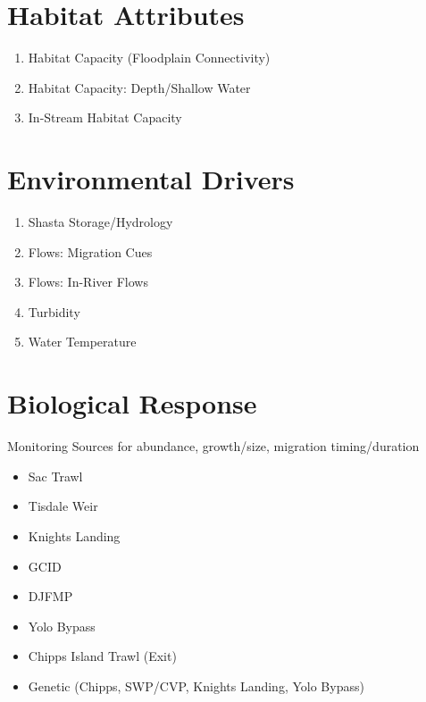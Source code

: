 \documentclass[
]{book}
\providecommand{\tightlist}{%
  \setlength{\itemsep}{0pt}\setlength{\parskip}{0pt}}
\theoremstyle{definition}
\theoremstyle{definition}
\theoremstyle{definition}
\theoremstyle{definition}
\theoremstyle{remark}
\begin{document}
\hypertarget{habitat-attributes-3}{%
\section{Habitat Attributes}\label{habitat-attributes-3}}

\begin{enumerate}
\def\labelenumi{\arabic{enumi}.}
\item
  Habitat Capacity (Floodplain Connectivity)
\item
  Habitat Capacity: Depth/Shallow Water
\item
  In-Stream Habitat Capacity
\end{enumerate}

\hypertarget{environmental-drivers-2}{%
\section{Environmental Drivers}\label{environmental-drivers-2}}

\begin{enumerate}
\def\labelenumi{\arabic{enumi}.}
\item
  Shasta Storage/Hydrology
\item
  Flows: Migration Cues
\item
  Flows: In-River Flows
\item
  Turbidity
\item
  Water Temperature
\end{enumerate}

\hypertarget{biological-response-3}{%
\section{Biological Response}\label{biological-response-3}}

Monitoring Sources for abundance, growth/size, migration timing/duration

\begin{itemize}
\tightlist
\item
  Sac Trawl
\item
  Tisdale Weir
\item
  Knights Landing
\item
  GCID
\item
  DJFMP
\item
  Yolo Bypass
\item
  Chipps Island Trawl (Exit)
\item
  Genetic (Chipps, SWP/CVP, Knights Landing, Yolo Bypass)
\end{itemize}
\end{document}
